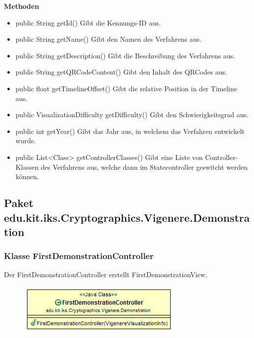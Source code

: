 \documentclass{article}
\begin{document}
      \textbf{Methoden}
      \begin{itemize}
        \item public String getId() \newline
        Gibt die Kennungs-ID aus.
        \item public String getName() \newline
        Gibt den Namen des Verfahrens aus.
        \item public String getDescription() \newline
        Gibt die Beschreibung des Verfahrens aus.
        \item public String getQRCodeContent() \newline
        Gibt den Inhalt des QRCodes aus.
        \item public float getTimelineOffset() \newline
        Gibt die relative Position in der Timeline aus.
        \item public VisualizationDifficulty getDifficulty() \newline
        Gibt den Schwierigkeitsgrad aus.
        \item public int getYear() \newline
        Gibt das Jahr aus, in welchem das Verfahren entwickelt wurde.
        \item public List<Class> getControllerClasses() \newline
        Gibt eine Liste von Controller-Klassen des Verfahrens aus, welche dann im Statecontroller geswitcht werden können.
      \end{itemize}

  \subsection{Paket edu.kit.iks.Cryptographics.Vigenere.Demonstration}
    \subsubsection{Klasse FirstDemonstrationController}
      Der FirstDemonstrationController erstellt FirstDemonstrationView.
      \begin{figure}[H]
        \centering
        \includegraphics{resources/edu-kit-iks-Cryptographics-Vigenere-FirstDemonstrationController}
      \end{figure}
\end{document}
